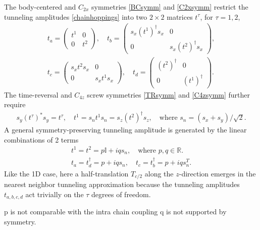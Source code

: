 The body-centered and $C_{2x}$ symmetries \eqref{BCsymm} and \eqref{C2xsymm} restrict the tunneling amplitudes \eqref{chainhoppings} into two $2\times2$ matrices $t^\tau$, for $\tau=1,2$, 
\begin{align}
t_a=\begin{pmatrix}t^1&0\\0&t^2\end{pmatrix},\quad t_b=\begin{pmatrix}s_x(t^1)^\dagger s_x&0\\0&s_x(t^2)^\dagger s_x\end{pmatrix},\\
t_c=\begin{pmatrix}s_xt^2s_x&0\\0&s_xt^1s_x\end{pmatrix},\quad t_d=\begin{pmatrix}(t^2)^\dagger&0\\0&(t^1)^\dagger\end{pmatrix}.\end{align} The time-reversal and $C_{4z}$ screw symmetries \eqref{TRsymm} and \eqref{C4zsymm} further require \begin{align}s_y(t^\tau)^\ast s_y=t^\tau,\quad t^1=s_nt^1s_n=s_z(t^2)^\dagger s_z,\quad\mbox{where }s_n=(s_x+s_y)/\sqrt{2}.\label{nnhoppingt} \end{align} A general symmetry-preserving tunneling amplitude is generated by the linear combinations of 2 terms \begin{gather}t^1=t^2=p\mathbb{I}+iqs_n,\quad\mbox{where $p,q\in\mathbb{R}$.}\nonumber\\t_a=t_d^\dagger=p+iqs_n,\quad t_c=t_b^\dagger=p+iqs_n^T.\end{gather} Like the 1D case, here a half-translation $T_{c/2}$ along the $z$-direction emerges in the nearest neighbor tunneling approximation because the tunneling amplitudes $t_{a,b,c,d}$ act trivially on the $\tau$ degrees of freedom. 

{\color{red} p is not comparable with the intra chain coupling
q is not supported by symmetry.}

